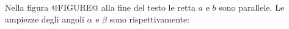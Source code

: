 Nella 
figura @FIGURE@ alla fine del testo
 le retta $a$ e $b$ sono parallele. Le ampiezze 
degli angoli $\alpha$ e $\beta$ sono
rispettivamente: